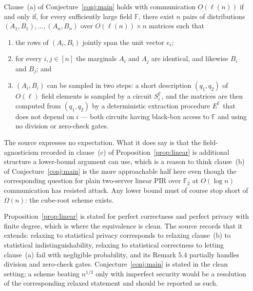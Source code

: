 \documentclass{aicr-conjecture}
\newcommand{\F}{\mathbb{F}}
\begin{document}
\begin{proposition}\label{prop:linear}
Clause~(a) of Conjecture~\ref{conj:main} holds with communication
$O(\ell(n))$ if and only if, for every sufficiently large field $\F$,
there exist $n$ pairs of distributions $(A_{1}, B_{1}), \dots, (A_{n},
B_{n})$ over $O(\ell(n)) \times n$ matrices such that
\begin{enumerate}[nosep,label=(\alph*)]
  \item the rows of $(A_{i}, B_{i})$ jointly span the unit vector
    $e_{i}$;
  \item for every $i, j \in [n]$ the marginals $A_{i}$ and $A_{j}$ are
    identical, and likewise $B_{i}$ and $B_{j}$; and
  \item $(A_{i}, B_{i})$ can be sampled in two steps: a short
    description $(q_{1}, q_{2})$ of $O(\ell)$ field elements is sampled
    by a circuit $S^{\F}_{i}$, and the matrices are then computed from
    $(q_{1},q_{2})$ by a deterministic extraction procedure $E^{\F}$ that
    does not depend on $i$ --- both circuits having black-box access to
    $\F$ and using no division or zero-check gates.
\end{enumerate}
\end{proposition}

\begin{remark}
The source expresses no expectation. What it does say is that the
field-agnosticism recorded in clause~(c) of
Proposition~\ref{prop:linear} is additional structure a lower-bound
argument can use, which is a reason to think clause~(b) of
Conjecture~\ref{conj:main} is the more approachable half here even though
the corresponding question for plain two-server linear PIR over $\F_{2}$
at $O(\log n)$ communication has resisted attack. Any lower bound must
of course stop short of $\Omega(n)$: the cube-root scheme exists.
\end{remark}

\begin{remark}
Proposition~\ref{prop:linear} is stated for perfect correctness and
perfect privacy with finite degree, which is where the equivalence is
clean. The source records that it extends: relaxing to statistical
privacy corresponds to relaxing clause~(b) to statistical
indistinguishability, relaxing to statistical correctness to letting
clause~(a) fail with negligible probability, and its Remark 5.4 partially
handles division and zero-check gates. Conjecture~\ref{conj:main} is
stated in the clean setting; a scheme beating $n^{1/3}$ only with
imperfect security would be a resolution of the corresponding relaxed
statement and should be reported as such.
\end{remark}
\end{document}
